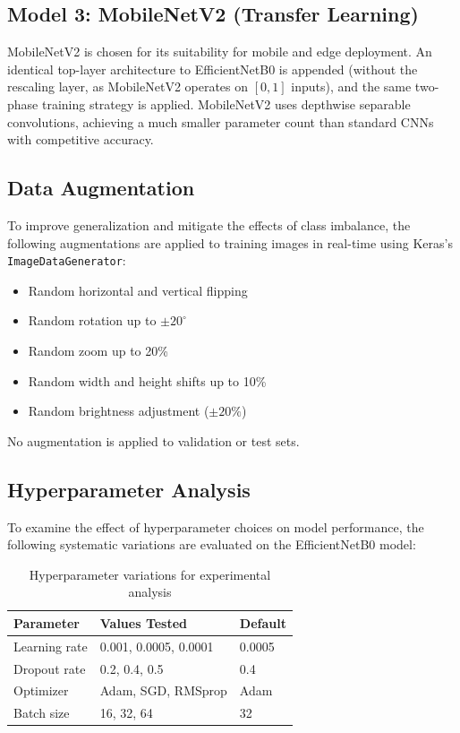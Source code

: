 \documentclass[10pt,twocolumn]{article}
\begin{document}
\subsection{Model 3: MobileNetV2 (Transfer Learning)}

MobileNetV2 \cite{MobileNetV2_2018} is chosen for its suitability for mobile and edge deployment. An identical top-layer architecture to EfficientNetB0 is appended (without the rescaling layer, as MobileNetV2 operates on $[0,1]$ inputs), and the same two-phase training strategy is applied. MobileNetV2 uses depthwise separable convolutions, achieving a much smaller parameter count than standard CNNs with competitive accuracy.

\subsection{Data Augmentation}

To improve generalization and mitigate the effects of class imbalance, the following augmentations are applied to training images in real-time using Keras's \texttt{ImageDataGenerator}:
\begin{itemize}
  \item Random horizontal and vertical flipping
  \item Random rotation up to $\pm 20^{\circ}$
  \item Random zoom up to 20\%
  \item Random width and height shifts up to 10\%
  \item Random brightness adjustment ($\pm 20\%$)
\end{itemize}

No augmentation is applied to validation or test sets.

\subsection{Hyperparameter Analysis}

To examine the effect of hyperparameter choices on model performance, the following systematic variations are evaluated on the EfficientNetB0 model:

\begin{table}[H]
\centering
\caption{Hyperparameter variations for experimental analysis}
\label{tab:hyperparams}
\begin{tabular}{lll}
\toprule
\textbf{Parameter} & \textbf{Values Tested} & \textbf{Default} \\
\midrule
Learning rate & 0.001, 0.0005, 0.0001 & 0.0005 \\
Dropout rate & 0.2, 0.4, 0.5 & 0.4 \\
Optimizer & Adam, SGD, RMSprop & Adam \\
Batch size & 16, 32, 64 & 32 \\
\bottomrule
\end{tabular}
\end{table}
\end{document}

